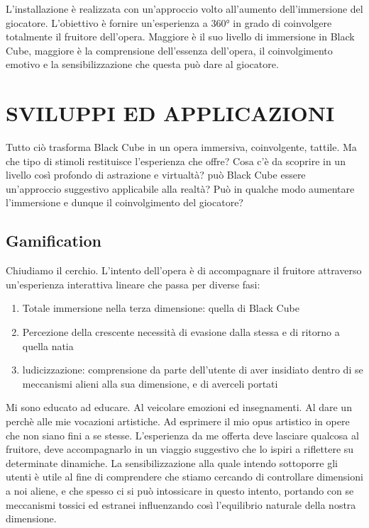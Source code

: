 L'installazione è realizzata con un'approccio volto all'aumento dell'immersione del giocatore. L'obiettivo è fornire un'esperienza a 360° in grado di coinvolgere totalmente il fruitore dell'opera. Maggiore è il suo livello di immersione in Black Cube, maggiore è la comprensione dell'essenza dell'opera, il coinvolgimento emotivo e la sensibilizzazione che questa può dare al giocatore.

\section{SVILUPPI ED APPLICAZIONI}
Tutto ciò trasforma Black Cube in un opera immersiva, coinvolgente, tattile. Ma che tipo di stimoli restituisce l'esperienza che offre? Cosa c'è da scoprire in un livello così profondo di astrazione e virtualtà? può Black Cube essere un'approccio suggestivo applicabile alla realtà? Può in qualche modo aumentare l'immersione e dunque il coinvolgimento del giocatore?

\subsection{Gamification}
Chiudiamo il cerchio. L'intento dell'opera è di accompagnare il fruitore attraverso un'esperienza interattiva lineare che passa per diverse fasi:

\begin{enumerate}
	\item Totale immersione nella terza dimensione: quella di Black Cube
	\item Percezione della crescente necessità di evasione dalla stessa e di ritorno a quella natia
	\item ludicizzazione: comprensione da parte dell'utente di aver insidiato dentro di se meccanismi alieni alla sua dimensione, e di averceli portati
\end{enumerate}

Mi sono educato ad educare. Al veicolare emozioni ed insegnamenti. Al dare un perchè alle mie vocazioni artistiche. Ad esprimere il mio opus artistico in opere che non siano fini a se stesse. L'esperienza da me offerta deve lasciare qualcosa al fruitore, deve accompagnarlo in un viaggio suggestivo che lo ispiri a riflettere su determinate dinamiche.
La sensibilizzazione alla quale intendo sottoporre gli utenti è utile al fine di comprendere che stiamo cercando di controllare dimensioni a noi aliene, e che spesso ci si può intossicare in questo intento, portando con se meccanismi tossici ed estranei influenzando così l'equilibrio naturale della nostra dimensione.
	
